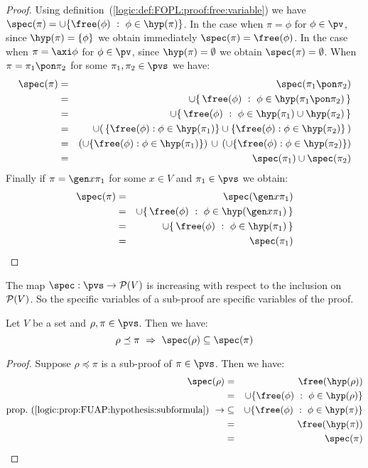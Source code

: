 \begin{proof}
Using definition~(\ref{logic:def:FOPL:proof:free:variable}) we have
$\spec(\pi)=\cup\{\free(\phi)\ :\ \phi\in\hyp(\pi)\}$. In the case
when $\pi=\phi$ for $\phi\in\pv$, since $\hyp(\pi)=\{\phi\}$ we
obtain immediately $\spec(\pi)=\free(\phi)$. In the case when
$\pi=\axi\phi$ for $\phi\in\pv$, since $\hyp(\pi)=\emptyset$ we
obtain $\spec(\pi)=\emptyset$. When $\pi=\pi_{1}\pon\pi_{2}$ for
some $\pi_{1},\pi_{2}\in\pvs$ we have:
    \begin{eqnarray*}
    \spec(\pi)&=&\spec(\pi_{1}\pon\pi_{2})\\
    &=&\cup\{\,\free(\phi)\ :\ \phi\in\hyp(\pi_{1}\pon\pi_{2})\,\}\\
    &=&\cup\{\,\free(\phi)\ :\ \phi\in\hyp(\pi_{1})\cup\hyp(\pi_{2})\,\}\\
    &=&\cup(\,\{\free(\phi):\phi\in\hyp(\pi_{1})\}\cup\{\free(\phi):\phi\in\hyp(\pi_{2})\}\,)\\
    &=&(\cup\{\free(\phi):\phi\in\hyp(\pi_{1})\})\,\cup\,(\cup\{\free(\phi):\phi\in\hyp(\pi_{2})\})\\
    &=&\spec(\pi_{1})\cup\spec(\pi_{2})
    \end{eqnarray*}
Finally if $\pi=\gen x\pi_{1}$ for some $x\in V$ and
$\pi_{1}\in\pvs$ we obtain:
    \begin{eqnarray*}
    \spec(\pi)&=&\spec(\gen x\pi_{1})\\
    &=&\cup\{\,\free(\phi)\ :\ \phi\in\hyp(\gen x\pi_{1})\,\}\\
    &=&\cup\{\,\free(\phi)\ :\ \phi\in\hyp(\pi_{1})\,\}\\
    &=&\spec(\pi_{1})
    \end{eqnarray*}
\end{proof}

The map $\spec:\pvs\to{\cal P}(V)$ is increasing with respect to the
inclusion on ${\cal P}(V)$. So the specific variables of a sub-proof
are specific variables of the proof.

\begin{prop}\label{logic:prop:FUAP:freevar:subformula}
Let $V$ be a set and $\rho,\pi\in\pvs$. Then we have:
    \[
    \rho\preceq\pi\ \Rightarrow\ \spec(\rho)\subseteq\spec(\pi)
    \]
\end{prop}
\begin{proof}
Suppose $\rho\preceq\pi$ is a sub-proof of $\pi\in\pvs$. Then we
have:
    \begin{eqnarray*}
    \spec(\rho)&=&\free(\hyp(\rho))\\
    &=&\cup\{\free(\phi)\ :\ \phi\in\hyp(\rho)\}\\
    \mbox{prop.~(\ref{logic:prop:FUAP:hypothesis:subformula})}\ \rightarrow
    &\subseteq&\cup\{\free(\phi)\ :\ \phi\in\hyp(\pi)\}\\
    &=&\free(\hyp(\pi))\\
    &=&\spec(\pi)
    \end{eqnarray*}
\end{proof}

